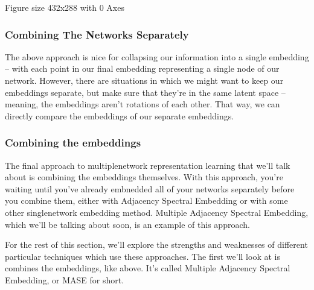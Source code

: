 \documentclass[letterpaper,10pt,english]{jupyterBook}
\begin{document}
\begin{sphinxVerbatim}[commandchars=\\\{\}]
\PYGZlt{}Figure size 432x288 with 0 Axes\PYGZgt{}
\end{sphinxVerbatim}

\noindent{}


\subsubsection{Combining The Networks Separately}
\label{\detokenize{representations/ch6/multigraph-representation-learning:combining-the-networks-separately}}
\sphinxAtStartPar
The above approach is nice for collapsing our information into a single embedding – with each point in our final embedding representing a single node of our network. However, there are situations in which we might want to keep our embeddings separate, but make sure that they’re in the same latent space – meaning, the embeddings aren’t rotations of each other. That way, we can directly compare the embeddings of our separate embeddings.

\noindent{}


\subsubsection{Combining the embeddings}
\label{\detokenize{representations/ch6/multigraph-representation-learning:combining-the-embeddings}}
\sphinxAtStartPar
The final approach to multiple\sphinxhyphen{}network representation learning that we’ll talk about is combining the embeddings themselves. With this approach, you’re waiting until you’ve already embnedded all of your networks separately before you combine them, either with Adjacency Spectral Embedding or with some other single\sphinxhyphen{}network embedding method. Multiple Adjacency Spectral Embedding, which we’ll be talking about soon, is an example of this approach.

\noindent{}

\sphinxAtStartPar
For the rest of this section, we’ll explore the strengths and weaknesses of different particular techniques which use these approaches. The first we’ll look at is combines the embeddings, like above. It’s called Multiple Adjacency Spectral Embedding, or MASE for short.
\end{document}
